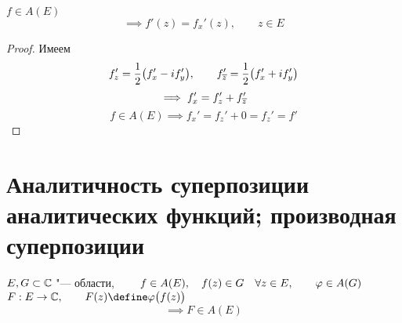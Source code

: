 \begin{implication}
	$ f \in A(E) $
	$$ \implies f'(z) = f_x'(z), \qquad z \in E $$
\end{implication}

\begin{proof}
	Имеем
	$$ f_z' = \frac12 \big( f_x' - if_y' \big), \qquad f_{\overline z}' = \frac12 \big( f_x' + if_y' \big) $$
	$$ \implies f_x' = f_z' + f_{\overline z}' $$
	$$ f \in A(E) \implies f_x' = f_z' + 0 = f_z' = f' $$
\end{proof}

\section{Аналитичность суперпозиции аналитических функций; производная суперпозиции}

\begin{theorem}
	$ E, G \subset \mathbb{C} $ "--- области, $ \qquad f \in A(E), \quad f(z) \in G \quad \forall z \in E, \qquad \varphi \in A(G) $ \\
	$ F : E \to \Co, \qquad F(z) \define \vphi \big( f(z) \big) $
	$$ \implies F \in A(E) $$
\end{theorem}

